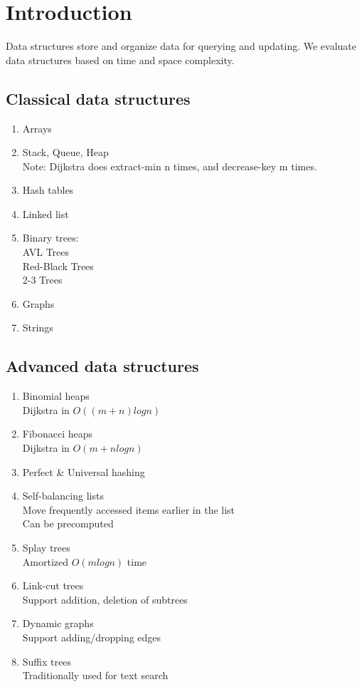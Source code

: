 \documentclass[a4paper]{article}
\begin{document}
\section{Introduction}

Data structures store and organize data for querying and updating. We evaluate data structures based on time and space complexity.

\subsection{Classical data structures}

\begin{enumerate}
  \item Arrays
  \item Stack, Queue, Heap\\
    Note: Dijkstra does extract-min n times, and decrease-key m times.
  \item Hash tables
  \item Linked list
  \item Binary trees:\\
    AVL Trees\\
    Red-Black Trees\\
    2-3 Trees
  \item Graphs
  \item Strings
\end{enumerate}

\subsection{Advanced data structures}

\begin{enumerate}
  \item Binomial heaps \\
    Dijkstra in $O((m+n)logn)$
  \item Fibonacci heaps \\
    Dijkstra in $O(m+nlogn)$
  \item Perfect \& Universal hashing
  \item Self-balancing lists\\
    Move frequently accessed items earlier in the list\\
    Can be precomputed
  \item Splay trees\\
    Amortized $O(mlogn)$ time
  \item Link-cut trees\\
    Support addition, deletion of subtrees
  \item Dynamic graphs\\
    Support adding/dropping edges
  \item Suffix trees\\
    Traditionally used for text search
\end{enumerate}
\end{document}
